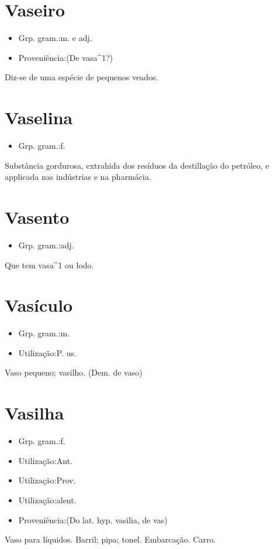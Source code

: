 \documentclass{article}
\begin{document}
\section{Vaseiro}
\begin{itemize}
\item {Grp. gram.:m.  e  adj.}
\end{itemize}
\begin{itemize}
\item {Proveniência:(De \textunderscore vasa\textunderscore ^1?)}
\end{itemize}
Diz-se de uma espécie de pequenos veados.
\section{Vaselina}
\begin{itemize}
\item {Grp. gram.:f.}
\end{itemize}
Substância gordurosa, extrahida dos resíduos da destillação do petróleo, e applicada nas indústrias e na pharmácia.
\section{Vasento}
\begin{itemize}
\item {Grp. gram.:adj.}
\end{itemize}
Que tem vasa^1 ou lodo.
\section{Vasículo}
\begin{itemize}
\item {Grp. gram.:m.}
\end{itemize}
\begin{itemize}
\item {Utilização:P. us.}
\end{itemize}
Vaso pequeno; vasilho.
(Dem. de \textunderscore vaso\textunderscore )
\section{Vasilha}
\begin{itemize}
\item {Grp. gram.:f.}
\end{itemize}
\begin{itemize}
\item {Utilização:Ant.}
\end{itemize}
\begin{itemize}
\item {Utilização:Prov.}
\end{itemize}
\begin{itemize}
\item {Utilização:alent.}
\end{itemize}
\begin{itemize}
\item {Proveniência:(Do lat. hyp. \textunderscore vasilia\textunderscore , de \textunderscore vas\textunderscore )}
\end{itemize}
Vaso para líquidos.
Barril; pipa; tonel.
Embarcação.
Carro.
\end{document}
